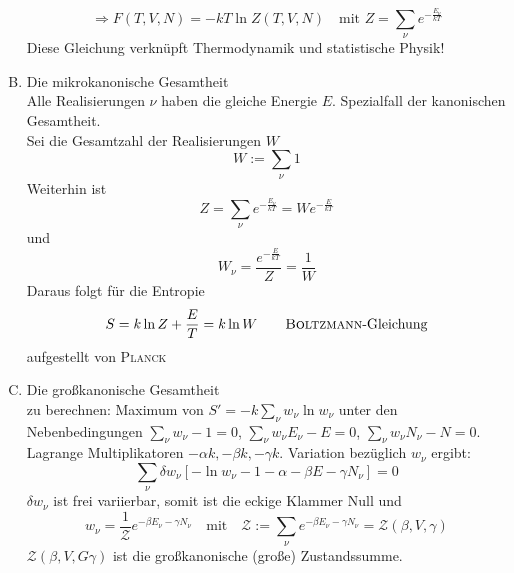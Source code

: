 \begin{enumerate}[A)]
\begin{equation}
    \end{equation}
    \begin{equation}
        \Rightarrow F(T, V, N) = - k T \ln Z (T, V, N) \quad \text{mit } Z = \sum_\nu e^{- \frac{E_\nu}{k T}}
    \end{equation}
    Diese Gleichung verknüpft Thermodynamik und statistische Physik!
    \item Die mikrokanonische Gesamtheit \\
    Alle Realisierungen $\nu$ haben die gleiche Energie $E$. Spezialfall der kanonischen Gesamtheit.\\
    Sei die Gesamtzahl der Realisierungen $W$
    \begin{equation}
        W := \sum_\nu 1
    \end{equation}
    Weiterhin ist
    \begin{equation}
        Z = \sum_\nu e^{- \frac{E_\nu}{k T}} = W e^{- \frac{E}{k T}}
    \end{equation}
    und
    \begin{equation}
        W_\nu = \frac{e^{-\frac{E}{kT}}}{Z} = \frac{1}{W}
    \end{equation}
    Daraus folgt für die Entropie
    \begin{equation}
        S = k \ln Z + \frac{E}{T} = k \ln W  \qquad \text{\textsc{Boltzmann}-Gleichung}
    \end{equation}
    aufgestellt von \textsc{Planck}
    \item Die großkanonische Gesamtheit \\
    zu berechnen: Maximum von $S'=-k \sum_\nu w_\nu \ln w_\nu$ unter den Nebenbedingungen $\sum_\nu w_\nu - 1 = 0$, $\sum_\nu w_\nu E_\nu - E = 0$,
    $\sum_\nu w_\nu N_\nu - N = 0$. \\
    Lagrange Multiplikatoren $-\alpha k, - \beta k, - \gamma k$. Variation bezüglich $w_\nu$ ergibt:
    \begin{equation}
        \sum_\nu \delta w_\nu \left[ - \ln w_\nu - 1 - \alpha - \beta E - \gamma N_\nu \right] = 0
    \end{equation}
    $\delta w_\nu$ ist frei variierbar, somit ist die eckige Klammer Null und
    \begin{equation}
        w_\nu = \frac{1}{\mathcal{Z}} e^{- \beta E_\nu- \gamma N_\nu} \quad \text{mit} \quad
        \mathcal{Z} := \sum_\nu e^{- \beta E_\nu - \gamma N_\nu} = \mathcal{Z}(\beta, V, \gamma)
    \end{equation}
    $\mathcal{Z}(\beta, V, G\gamma)$ ist die großkanonische (große) Zustandssumme. \\

\end{enumerate}
